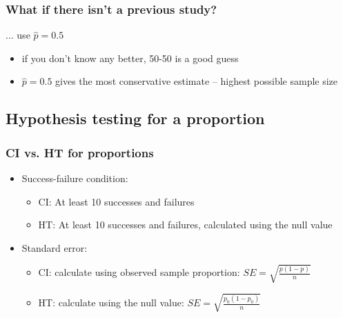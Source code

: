 
\begin{frame}
\frametitle{What if there isn't a previous study?}

... use $\hat{p} = 0.5$

\vspace{1cm}

\pause

\begin{itemize}
\item if you don't know any better, 50-50 is a good guess
\pause
\item $\hat{p} = 0.5$ gives the most conservative estimate -- highest possible sample size
\end{itemize}

\end{frame}


\subsection{Hypothesis testing for a proportion}


\begin{frame}
\frametitle{CI vs. HT for proportions}

\begin{itemize}

\item Success-failure condition:
\begin{itemize}
\item CI: At least 10  successes and failures
\item HT: At least 10  successes and failures, calculated using the null value
\end{itemize}

\item Standard error:
\begin{itemize}
\item CI: calculate using observed sample proportion: $SE = \sqrt{\frac{p(1-p)}{n}}$
\item HT: calculate using the null value: $SE = \sqrt{\frac{p_0(1-p_0)}{n}}$
\end{itemize}

\end{itemize}

\end{frame}


